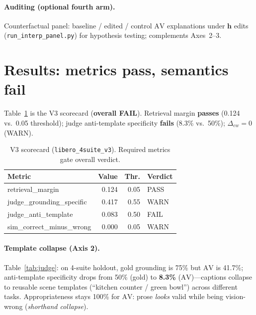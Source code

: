 \documentclass[10pt]{article}
\newcommand{\AV}{\ensuremath{\mathrm{AV}}}
\newcommand{\hvec}{\mathbf{h}}
\newcommand{\code}[1]{\texttt{\small #1}}
\begin{document}
\paragraph{Auditing (optional fourth arm).}
Counterfactual panel: baseline / edited / control \(\AV\) explanations under
\(\hvec\) edits (\code{run\_interp\_panel.py}) for hypothesis testing;
complements Axes~2--3.

\section{Results: metrics pass, semantics fail}
\label{sec:results}

Table~\ref{tab:scorecard} is the V3 scorecard (\textbf{overall FAIL}).
Retrieval margin \textbf{passes} (0.124 vs.\ 0.05 threshold); judge
anti-template specificity \textbf{fails} (8.3\% vs.\ 50\%);
\(\Delta_{cw}=0\) (WARN).

\begin{table}[t]
  \centering
  \caption{V3 scorecard (\code{libero\_4suite\_v3}). Required metrics
  gate overall verdict.}
  \label{tab:scorecard}
  \small
  \begin{tabular}{@{}lrrl@{}}
    \toprule
    Metric & Value & Thr. & Verdict \\
    \midrule
    retrieval\_margin & 0.124 & 0.05 & PASS \\
    judge\_grounding\_specific & 0.417 & 0.55 & WARN \\
    judge\_anti\_template & 0.083 & 0.50 & FAIL \\
    sim\_correct\_minus\_wrong & 0.000 & 0.05 & WARN \\
    \bottomrule
  \end{tabular}
\end{table}

\paragraph{Template collapse (Axis 2).}
Table~\ref{tab:judge}: on 4-suite holdout, gold grounding is 75\% but
\(\AV\) is 41.7\%; anti-template specificity drops from 50\% (gold) to
\textbf{8.3\%} (\(\AV\))---captions collapse to reusable scene templates
(``kitchen counter / green bowl'') across different tasks.
Appropriateness stays 100\% for \(\AV\): prose \emph{looks} valid while
being vision-wrong (\emph{shorthand collapse}).
\end{document}
